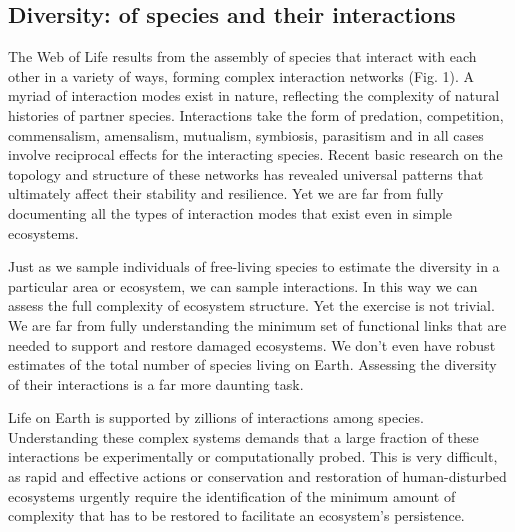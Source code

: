\documentclass[10pt,letterpaper]{article}
\begin{document}
\subsection*{Diversity: of species and their interactions}

The Web of Life results from the assembly of species that interact with each other in a variety of ways, forming complex interaction networks (Fig. 1). A myriad of interaction modes exist in nature, reflecting the complexity of natural histories of partner species. Interactions take the form of predation, competition, commensalism, amensalism, mutualism, symbiosis, parasitism and in all cases involve reciprocal effects for the interacting species. Recent basic research on the topology and structure of these networks has revealed universal patterns that ultimately affect their stability and resilience. Yet we are far from fully documenting all the types of interaction modes that exist even in simple ecosystems. 

Just as we sample individuals of free-living species to estimate the diversity in a particular area or ecosystem, we can sample interactions. In this way we can assess the full complexity of ecosystem structure. Yet the exercise is not trivial. We are far from fully understanding the minimum set of functional links that are needed to support and restore damaged ecosystems. We don’t even have robust estimates of the total number of species living on Earth. Assessing the diversity of their interactions is a far more daunting task.

Life on Earth is supported by zillions of interactions among species. Understanding these complex systems demands that a large fraction of these interactions be experimentally or computationally probed. This is very difficult, as rapid and effective actions or conservation and restoration of human-disturbed ecosystems urgently require the identification of the minimum amount of complexity that has to be restored to facilitate an ecosystem’s persistence. 
\end{document}
